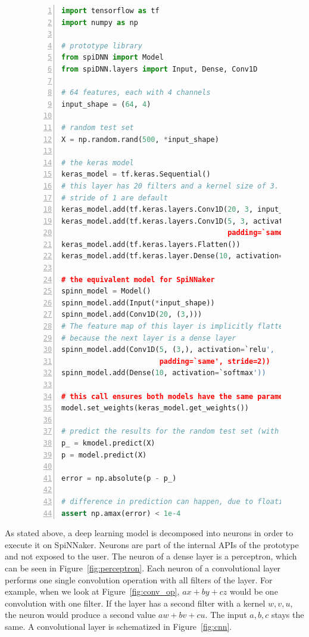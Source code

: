 \documentclass[]{article}
\begin{document}
\begin{figure} %
\begin{lstlisting}[language=Python, caption={Example code comparing
  inference with 1D \acrshort{cnn}s in Keras to inference with the prototype.},
  captionpos=b, label=lst:spiDNN_vs_keras_cnns, numbers=left]
import tensorflow as tf
import numpy as np

# prototype library
from spiDNN import Model
from spiDNN.layers import Input, Dense, Conv1D

# 64 features, each with 4 channels
input_shape = (64, 4)

# random test set
X = np.random.rand(500, *input_shape)

# the keras model
keras_model = tf.keras.Sequential()
# this layer has 20 filters and a kernel size of 3. Valid padding and a
# stride of 1 are default
keras_model.add(tf.keras.layers.Conv1D(20, 3, input_shape=input_shape))
keras_model.add(tf.keras.layers.Conv1D(5, 3, activation=`relu',
                                       padding=`same', strides=2))
keras_model.add(tf.keras.layers.Flatten())
keras_model.add(tf.keras.layer.Dense(10, activation=`softmax'))

# the equivalent model for SpiNNaker
spinn_model = Model()
spinn_model.add(Input(*input_shape))
spinn_model.add(Conv1D(20, (3,)))
# The feature map of this layer is implicitly flattened,
# because the next layer is a dense layer
spinn_model.add(Conv1D(5, (3,), activation=`relu',
                       padding=`same', stride=2))
spinn_model.add(Dense(10, activation=`softmax'))

# this call ensures both models have the same parameters
model.set_weights(keras_model.get_weights())

# predict the results for the random test set (with random weights)
p_ = kmodel.predict(X)
p = model.predict(X)

error = np.absolute(p - p_)

# difference in prediction can happen, due to floating point errors
assert np.amax(error) < 1e-4
\end{lstlisting}
\end{figure} %

As stated above, a deep learning model is decomposed into neurons
in order to execute it on SpiNNaker.
Neurons are part of the internal APIs of the prototype and not exposed
to the user.
The neuron of a dense layer is a perceptron, which can be seen in
Figure~\ref{fig:perceptron}.
Each neuron of a convolutional layer performs one single convolution
operation with all filters of the layer.
For example, when we look at Figure~\ref{fig:conv_op}, $ax + by + cz$
would be one convolution with one filter.
If the layer has a second filter with a kernel $w, v, u$, the neuron
would produce a second value $aw + bv + cu$.
The input $a, b, c$ stays the same.
A convolutional layer is schematized in Figure~\ref{fig:cnn}.
\end{document}
